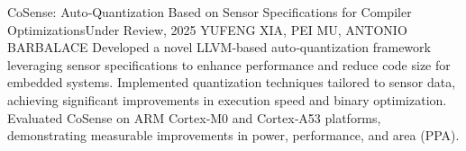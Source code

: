     \resumeSubheading
      {CoSense: Auto‑Quantization Based on Sensor Specifications for Compiler Optimizations}{Under Review, 2025}
      {YUFENG XIA, PEI MU, ANTONIO BARBALACE}{}
      \resumeItemListStart
          {Developed a novel LLVM‑based auto‑quantization framework leveraging sensor specifications to enhance performance and reduce code size for embedded systems.}
          {Implemented quantization techniques tailored to sensor data, achieving significant improvements in execution speed and binary optimization.}
          {Evaluated CoSense on ARM Cortex‑M0 and Cortex‑A53 platforms, demonstrating measurable improvements in power, performance, and area (PPA).}
      \resumeItemListEnd

  \resumeSubHeadingListEnd